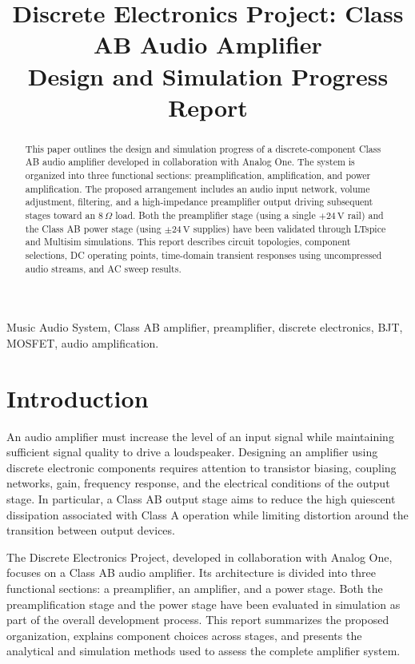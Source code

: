 \documentclass[conference]{IEEEtran}
\title{Discrete Electronics Project: Class AB Audio Amplifier\\\large Design and Simulation Progress Report}
\author{
\IEEEauthorblockN{
María Fernanda Morales Calderón,
Ian José Álvarez Arrieta,\\
Oscar Felipe Montejo Cordero,
Bryan Alessandro Elizondo Fallas,
Andrés Obregón López
}
\IEEEauthorblockA{
School of Electronics Engineering\\
Tecnológico de Costa Rica
}
}
\begin{document}
\maketitle

\setlength{\parskip}{\baselineskip}
\setlength{\parindent}{0pt}

\begin{abstract}
This paper outlines the design and simulation progress of a discrete-component Class AB audio amplifier developed in collaboration with Analog One. The system is organized into three functional sections: preamplification, amplification, and power amplification. The proposed arrangement includes an audio input network, volume adjustment, filtering, and a high-impedance preamplifier output driving subsequent stages toward an $8\,\Omega$ load. Both the preamplifier stage (using a single $+24\,\mathrm{V}$ rail) and the Class AB power stage (using $\pm24\,\mathrm{V}$ supplies) have been validated through LTspice and Multisim simulations. This report describes circuit topologies, component selections, DC operating points, time-domain transient responses using uncompressed audio streams, and AC sweep results.
\end{abstract}

\begin{IEEEkeywords}
Music Audio System, Class AB amplifier, preamplifier, discrete electronics, BJT, MOSFET, audio amplification.
\end{IEEEkeywords}

\section{Introduction}
An audio amplifier must increase the level of an input signal while maintaining sufficient signal quality to drive a loudspeaker. Designing an amplifier using discrete electronic components requires attention to transistor biasing, coupling networks, gain, frequency response, and the electrical conditions of the output stage. In particular, a Class AB output stage aims to reduce the high quiescent dissipation associated with Class A operation while limiting distortion around the transition between output devices.

The Discrete Electronics Project, developed in collaboration with Analog One, focuses on a Class AB audio amplifier. Its architecture is divided into three functional sections: a preamplifier, an amplifier, and a power stage. Both the preamplification stage and the power stage have been evaluated in simulation as part of the overall development process. This report summarizes the proposed organization, explains component choices across stages, and presents the analytical and simulation methods used to assess the complete amplifier system.
\end{document}
